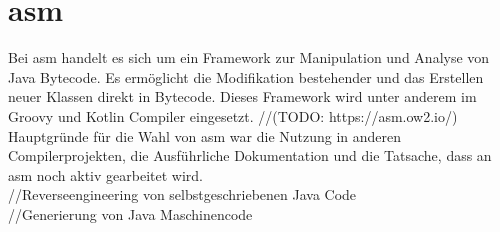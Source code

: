 \section{asm}
Bei asm handelt es sich um ein Framework zur Manipulation und Analyse von Java Bytecode. Es ermöglicht die Modifikation bestehender und das Erstellen neuer Klassen direkt in Bytecode. Dieses Framework wird unter anderem im Groovy und Kotlin Compiler eingesetzt.
//(TODO: https://asm.ow2.io/)
\\
Hauptgründe für die Wahl von asm war die Nutzung in anderen Compilerprojekten, die Ausführliche Dokumentation und die Tatsache, dass an asm noch aktiv gearbeitet wird.
\\
//Reverseengineering von selbstgeschriebenen Java Code
\\
//Generierung von Java Maschinencode
